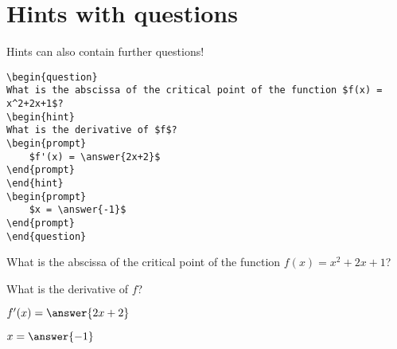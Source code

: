 \documentclass{ximera}
\begin{document}
\section{Hints with questions}

Hints can also contain further questions! 

\begin{verbatim}
\begin{question}
What is the abscissa of the critical point of the function $f(x) = x^2+2x+1$?
\begin{hint}
What is the derivative of $f$?
\begin{prompt}
	$f'(x) = \answer{2x+2}$
\end{prompt}
\end{hint}
\begin{prompt}
	$x = \answer{-1}$
\end{prompt}
\end{question}
\end{verbatim}

\begin{question}
  What is the abscissa of the critical point of the function $f(x) =
  x^2+2x+1$?
  \begin{hint}
    What is the derivative of $f$?
    \begin{prompt}
      $f'(x) = \answer{2x+2}$
    \end{prompt}
  \end{hint}
  \begin{prompt}
    $x =  \answer{-1}$
  \end{prompt}
\end{question}
\end{document}
